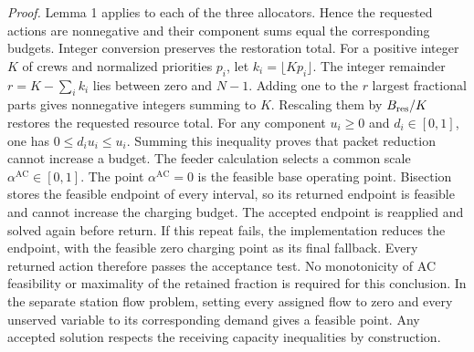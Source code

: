 \documentclass[journal]{IEEEtran}
\providecommand{\DIFadd}[1]{{\protect\color{blue}\uwave{#1}}} %
\renewcommand{\DIFadd}[1]{{\color{blue}#1}}
\begin{document}
\textit{\DIFadd{Proof.}}  \DIFadd{Lemma 1 applies to each of the three allocators.  Hence the
requested actions are nonnegative and their component sums equal the
corresponding budgets.  Integer conversion preserves the restoration total.
For a positive integer $K$ of crews and normalized priorities $p_i$, let $k_i=\lfloor Kp_i\rfloor$.
The integer remainder $r=K-\sum_i k_i$ lies between zero and $N-1$.
Adding one to the $r$ largest fractional parts gives nonnegative integers
summing to $K$.  Rescaling them by $B_{\rm res}/K$ restores the requested
resource total.  For any component $u_i\ge0$ and $d_i\in[0,1]$, one has
$0\le d_i u_i\le u_i$.  Summing this inequality proves that packet reduction
cannot increase a budget.  The feeder calculation selects a common scale
$\alpha^{\mathrm{AC}}\in[0,1]$.  The point $\alpha^{\mathrm{AC}}=0$ is the
feasible base operating point.  Bisection stores the feasible endpoint of every
interval, so its returned endpoint is feasible and cannot increase the charging
budget.  The accepted endpoint is reapplied and solved again before return.
If this repeat fails, the implementation reduces the endpoint, with the
feasible zero charging point as its final fallback.  Every returned action
therefore passes the acceptance test.  No monotonicity of AC feasibility or
maximality of the retained fraction is required for this conclusion.
In the separate station flow problem, setting every assigned flow to zero and
every unserved variable to its corresponding demand gives a feasible point.
Any accepted solution respects the receiving capacity inequalities by
construction.
}
\end{document}
